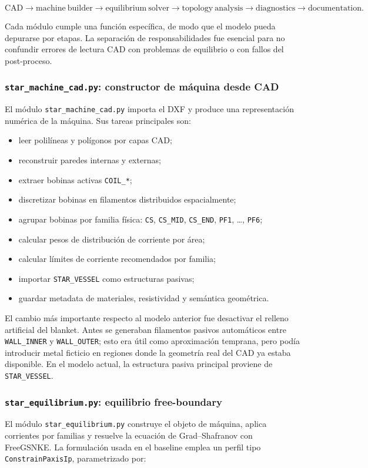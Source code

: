 \documentclass[11pt,a4paper]{article}
\begin{document}
\[
\mathrm{CAD}\rightarrow
\mathrm{machine\ builder}\rightarrow
\mathrm{equilibrium\ solver}\rightarrow
\mathrm{topology\ analysis}\rightarrow
\mathrm{diagnostics}\rightarrow
\mathrm{documentation}.
\]

Cada módulo cumple una función específica, de modo que el modelo pueda depurarse por etapas.
La separación de responsabilidades fue esencial para no confundir errores de lectura CAD con
problemas de equilibrio o con fallos del post-proceso.

\subsubsection{\texttt{star\_machine\_cad.py}: constructor de máquina desde CAD}
El módulo \texttt{star\_machine\_cad.py} importa el DXF y produce una representación numérica de
la máquina. Sus tareas principales son:

\begin{itemize}
    \item leer polilíneas y polígonos por capas CAD;
    \item reconstruir paredes internas y externas;
    \item extraer bobinas activas \texttt{COIL\_*};
    \item discretizar bobinas en filamentos distribuidos espacialmente;
    \item agrupar bobinas por familia física: \texttt{CS}, \texttt{CS\_MID}, \texttt{CS\_END},
    \texttt{PF1}, \ldots, \texttt{PF6};
    \item calcular pesos de distribución de corriente por área;
    \item calcular límites de corriente recomendados por familia;
    \item importar \texttt{STAR\_VESSEL} como estructuras pasivas;
    \item guardar metadata de materiales, resistividad y semántica geométrica.
\end{itemize}

El cambio más importante respecto al modelo anterior fue desactivar el relleno artificial del
blanket. Antes se generaban filamentos pasivos automáticos entre \texttt{WALL\_INNER} y
\texttt{WALL\_OUTER}; esto era útil como aproximación temprana, pero podía introducir metal
ficticio en regiones donde la geometría real del CAD ya estaba disponible. En el modelo actual,
la estructura pasiva principal proviene de \texttt{STAR\_VESSEL}.

\subsubsection{\texttt{star\_equilibrium.py}: equilibrio free-boundary}
El módulo \texttt{star\_equilibrium.py} construye el objeto de máquina, aplica corrientes por
familias y resuelve la ecuación de Grad--Shafranov con FreeGSNKE. La formulación usada en el
baseline emplea un perfil tipo \texttt{ConstrainPaxisIp}, parametrizado por:
\end{document}
